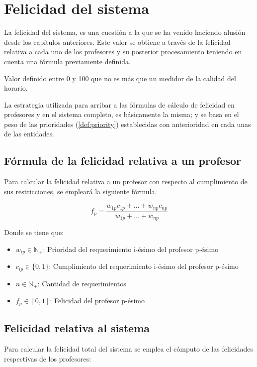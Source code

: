 \section{Felicidad del sistema}
\label{sec:happiness}

La felicidad del sistema, es una cuestión a la que se ha venido haciendo alusión desde los capítulos anteriores. Este valor se obtiene a través de la felicidad relativa a cada uno de los profesores y su posterior procesamiento teniendo en cuenta una fórmula previamente definida.

\begin{dfn} 
	Valor definido entre 0 y 100 que no es más que un medidor de la calidad del horario.
\end{dfn}

La estrategia utilizada para arribar a las fórmulas de cálculo de felicidad en profesores y en el sistema completo, es básicamente la misma; y se basa en el peso de las prioridades (\ref{def:priority}) establecidas con anterioridad en cada unas de las entidades.

\subsection{Fórmula de la felicidad relativa a un profesor}
Para calcular la felicidad relativa a un profesor con respecto al cumplimiento de sus restricciones, se empleará la siguiente fórmula.

\begin{equation}
	f_p = \frac{w_{1p}c_{1p} + \dots + w_{np}c_{np} }{w_{1p} + \dots + w_{np}}
\end{equation}

\noindent Donde se tiene que: \\

\begin{itemize}
 	\item $w_{ip} \in \mathbb{N}_+ $: Prioridad del requerimiento i-ésimo del profesor p-ésimo
	\item $c_{ip} \in \{0, 1\}$: Cumplimiento del requerimiento i-ésimo del profesor p-ésimo
	\item $n \in \mathbb{N}_+$: Cantidad de requerimientos
	\item $f_p \in [0, 1]$: Felicidad del profesor p-ésimo
\end{itemize}

\subsection{Felicidad relativa al sistema}
Para calcular la felicidad total del sistema se emplea el cómputo de las felicidades respectivas de los profesores:

